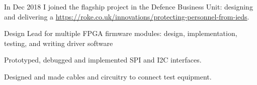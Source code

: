 {}
In Dec 2018 I joined the flagship project in the Defence Business Unit: designing and delivering a \href{miniaturised ECM software defined radio}{https://roke.co.uk/innovations/protecting-personnel-from-ieds}.
\vspace{0.25em}
\begin{tightemize}
  \item Design Lead for multiple FPGA firmware modules: design, implementation, testing, and writing driver software
  \item Prototyped, debugged and implemented SPI and I2C interfaces.
  \item Designed and made cables and circuitry to connect test equipment.
\end{tightemize}


\sectionsep

